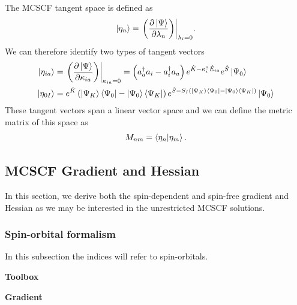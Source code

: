 \documentclass[11pt,a4paper]{article}
\newcommand{\hE}{\Hat{E}} %
\newcommand{\hK}{\Hat{K}} %
\newcommand{\hS}{\Hat{S}}
\newcommand{\cre}[1]{a_{#1}^\dagger} %
\newcommand{\ani}[1]{a_{#1}} %
\begin{document}
The MCSCF tangent space is defined as
\begin{equation}
  \label{eq:MCSCF_TangentVectors}
  \ket{\eta_n}=\evalat*{\mleft(\pdv{\ket{\Psi}}{\lambda_n}\mright)}{\lambda_i=0}.
\end{equation}
We can therefore identify two types of tangent vectors
\begin{align}
  \ket{\eta_{ia}}&=\evalat*{\mleft(\pdv{\ket{\Psi}}{\kappa_{ia}}\mright)}{\kappa_{ia}=0}=\left(\cre{a}\ani{i}-\cre{i}\ani{a}\right)e^{\hK-\kappa_i^a \hE_{ia}}e^{\hS}\ket{\Psi_0} \\
  \ket{\eta_{0I}}&= e^{\hK}\left(\ket{\Psi_K}\bra{\Psi_0}-\ket{\Psi_0}\bra{\Psi_K}\right)e^{\hS-S_{I}(\ket{\Psi_K}\bra{\Psi_0}-\ket{\Psi_0}\bra{\Psi_K})}\ket{\Psi_0}
\end{align}
These tangent vectors span a linear vector space and we can define the metric matrix of this space as
\begin{equation}
  \label{eq:MCSCF_TangentMetric}
  M_{nm}=\braket{\eta_n}{\eta_m}.
\end{equation}

\subsection{MCSCF Gradient and Hessian}

In this section, we derive both the spin-dependent and spin-free gradient and Hessian as we may be interested in the unrestricted MCSCF solutions.

\subsubsection{Spin-orbital formalism}

In this subsection the indices will refer to spin-orbitals.


\noindent\textbf{Toolbox}


\noindent\textbf{Gradient}
\end{document}
